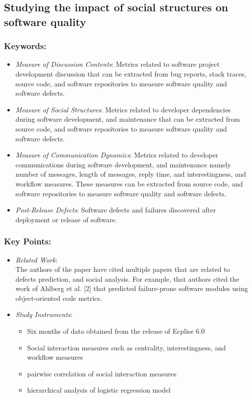 \documentclass{sig-alternate-05-2015}
\begin{document}
\subsection{Studying the impact of social structures on software quality \cite{Bettenburg:2010}}

\subsubsection{Keywords:}
\begin{itemize}
\item \emph{Measure of Discussion Contents}: Metrics related to software project development discussion that can be extracted from bug reports, stack traces, source code, and software repositories to measure software quality and software defects.
\item \emph{Measure of Social Structures}: Metrics related to developer dependencies during software development, and maintenance that can be extracted from source code, and software repositories to measure software quality and software defects.
\item \emph{Measure of Communication Dynamics}: Metrics related to developer communications during software development, and maintenance namely number of messages, length of messages, reply time, and interestingness, and workflow measures. These measures can be extracted from source code, and software repositories to measure software quality and software defects.
\item \emph{Post-Release Defects}: Software defects and failures discovered after deployment or release of software.
\end{itemize} 

\subsubsection{Key Points:}
\begin{itemize}
\item \emph{Related Work}: \\
The authors of the paper have cited multiple papers that are related to defects prediction, and social analysis. For example, that authors cited the work of Ahlberg et al. [2] that predicted failure-prone software modules using object-oriented code metrics.
\item \emph{Study Instruments}:
	\begin{itemize}
		\item Six months of data obtained from the release of Ecplise 6.0
		\item Social interaction measures such as centrality, interestingness, and workflow measures
		\item pairwise correlation of social interaction measures
		\item hierarchical analysis of logistic regression model
	\end{itemize}
\end{itemize}
\end{document}
